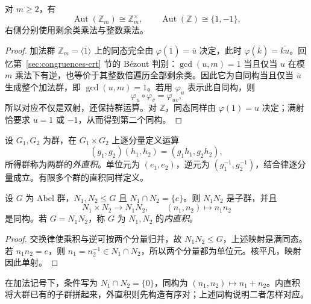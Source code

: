 \documentclass[lang=cn,a4paper,fontset=none,zihao=false,10pt,openany,twoside]{beautybook}
\numberwithin{algorithm}{chapter}
\begin{document}
\begin{example}[循环群的自同构]
对 $m\ge2$，有
\[
 \operatorname{Aut}(\mathbb Z_m)\cong\mathbb Z_m^\times,
 \qquad
 \operatorname{Aut}(\mathbb Z)\cong\{1,-1\},
\]
右侧分别使用剩余类乘法与整数乘法。
\end{example}
\begin{proof}
加法群 $\mathbb Z_m=\langle\overline1\rangle$ 上的同态完全由 $\varphi(\overline1)=\overline u$ 决定，此时 $\varphi(\overline k)=\overline{ku}$。回忆第~\ref{sec:congruences-crt} 节的 Bézout 判别：$\gcd(u,m)=1$ 当且仅当 $u$ 在模 $m$ 乘法下有逆，也等价于其整数倍遍历全部剩余类。因此它为自同构当且仅当 $\overline u$ 生成整个加法群，即 $\gcd(u,m)=1$。若用 $\varphi_u$ 表示此自同构，则
\[
 \varphi_u\circ\varphi_v=\varphi_{uv},
\]
所以对应不仅是双射，还保持群运算。对 $\mathbb Z$，同态同样由 $\varphi(1)=u$ 决定；满射恰要求 $u=1$ 或 $-1$，从而得到第二个同构。
\end{proof}

\begin{definition}[外直积]
设 $G_1,G_2$ 为群，在 $G_1\times G_2$ 上逐分量定义运算
\[
 (g_1,g_2)(h_1,h_2)=(g_1h_1,g_2h_2),
\]
所得群称为两群的\emph{外直积}。单位元为 $(e_1,e_2)$，逆元为 $(g_1^{-1},g_2^{-1})$，结合律逐分量成立。有限多个群的直积同样定义。
\end{definition}
\begin{proposition}\label{prop:abelian-internal-product}
设 $G$ 为 Abel 群，$N_1,N_2\le G$ 且 $N_1\cap N_2=\{e\}$。则 $N_1N_2$ 是子群，并且
\[
 N_1\times N_2\longrightarrow N_1N_2,
 \qquad(n_1,n_2)\longmapsto n_1n_2
\]
是同构。若 $G=N_1N_2$，称 $G$ 为 $N_1,N_2$ 的\emph{内直积}。
\end{proposition}
\begin{proof}
交换律使乘积与逆可按两个分量归并，故 $N_1N_2\le G$，上述映射是满同态。若 $n_1n_2=e$，则 $n_1=n_2^{-1}\in N_1\cap N_2$，所以两个分量都为单位元。核平凡，映射因此单射。
\end{proof}
在加法记号下，条件写为 $N_1\cap N_2=\{0\}$，同构为 $(n_1,n_2)\mapsto n_1+n_2$。内直积将大群已有的子群拼起来，外直积则先构造有序对；上述同构说明二者怎样对应。
\end{document}
